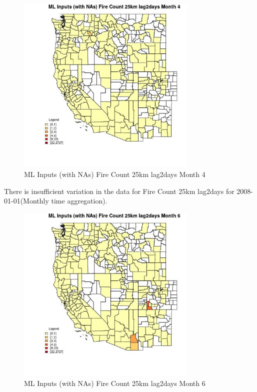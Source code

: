 \begin{figure} 
\centering  
\includegraphics[width=0.77\textwidth]{Code_Outputs/Report_ML_input_PM25_Step4_part_f_de_duplicated_aves_prioritize_24hr_obswNAs_CountyFire_Count_25km_lag2daysmedianMonth4.jpg} 
\caption{\label{fig:Report_ML_input_PM25_Step4_part_f_de_duplicated_aves_prioritize_24hr_obswNAsCountyFire_Count_25km_lag2daysmedianMonth4}ML Inputs (with NAs) Fire Count 25km lag2days Month 4} 
\end{figure} 
 

There is insufficient variation in the data for Fire Count 25km lag2days for 2008-01-01(Monthly time aggregation). 
 

\begin{figure} 
\centering  
\includegraphics[width=0.77\textwidth]{Code_Outputs/Report_ML_input_PM25_Step4_part_f_de_duplicated_aves_prioritize_24hr_obswNAs_CountyFire_Count_25km_lag2daysmedianMonth6.jpg} 
\caption{\label{fig:Report_ML_input_PM25_Step4_part_f_de_duplicated_aves_prioritize_24hr_obswNAsCountyFire_Count_25km_lag2daysmedianMonth6}ML Inputs (with NAs) Fire Count 25km lag2days Month 6} 
\end{figure} 
 


